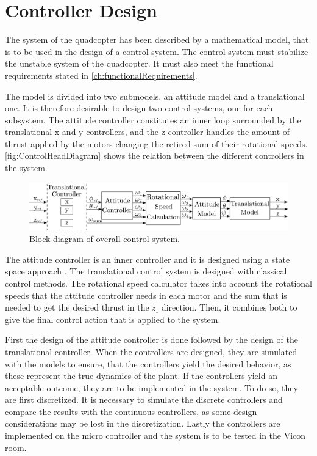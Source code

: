 \chapter{Controller Design}\label{chap:Control}
The system of the quadcopter has been described by a mathematical model, that is to be used in the design of a control system. The control system must stabilize the unstable system of the quadcopter. It must also meet the functional requirements stated in \autoref{ch:functionalRequirements}.

The model is divided into two submodels, an attitude model and a translational one. It is therefore desirable to design two control systems, one for each subsystem. The attitude controller constitutes an inner loop surrounded by the translational x and y controllers, and the z controller handles the amount of thrust applied by the motors changing the retired sum of their rotational speeds. \autoref{fig:ControlHeadDiagram} shows the relation between the different controllers in the system.
%
\begin{figure}[H]
	\centering
	\includegraphics[width=1 \textwidth]{figures/generalcontroldiagram}
	\caption{Block diagram of overall control system.}
	\label{fig:ControlHeadDiagram}
\end{figure}

The attitude controller is an inner controller and it is designed using a state space approach  \cite{ssReference}. The translational control system is designed with classical control methods. The rotational speed calculator takes into account the rotational speeds that the attitude controller needs in each motor and the sum that is needed to get the desired thrust in the $z_\mathrm{I}$ direction. Then, it combines both to give the final control action that is applied to the system.

First the design of the attitude controller is done followed by the design of the translational controller. When the controllers are designed, they are simulated with the models to ensure, that the controllers yield the desired behavior, as these represent the true dynamics of the plant. If the controllers yield an acceptable outcome, they are to be implemented in the system. To do so, they are first discretized. It is necessary to simulate the discrete controllers and compare the results with the continuous controllers, as some design considerations may be lost in the discretization. Lastly the controllers are implemented on the micro controller and the system is to be tested in the Vicon room. 